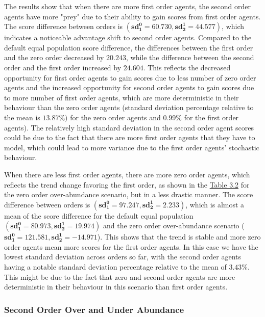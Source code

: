 The results show that when there are more first order agents, the second order agents have more "prey" due to their ability to gain scores from first order agents. The score difference between orders is $(\mathbf{sd^0_1 = 60.730}, \mathbf{sd^1_2 = 44.577})$, which indicates a noticeable advantage shift to second order agents. Compared to the default equal population score difference, the differences between the first order and the zero order decreased by $\mathbf{20.243}$, while the difference between the second order and the first order increased by $\mathbf{24.604}$. This reflects the decreased opportunity for first order agents to gain scores due to less number of zero order agents and the increased opportunity for second order agents to gain scores due to more number of first order agents, which are more deterministic in their behaviour than the zero order agents (standard deviation percentage relative to the mean is $\mathbf{13.87\%})$ for the zero order agents and $\mathbf{0.99\%}$ for the first order agents). The relatively high standard deviation in the second order agent scores could be due to the fact that there are more first order agents that they have to model, which could lead to more variance due to the first order agents' stochastic behaviour.

When there are less first order agents, there are more zero order agents, which reflects the trend change favoring the first order, as shown in the \hyperref[table:non-sig-zero-order-simple]{Table 3.2} for the zero order over-abundance scenario, but in a less drastic manner. The score difference between orders is $(\mathbf{sd^0_1 = 97.247}, \mathbf{sd^1_2 = 2.233})$, which is almost a mean of the score difference for the default equal population $(\mathbf{sd^0_1 = 80.973}, \mathbf{sd^1_2 = 19.974})$ and the zero order over-abundance scenario ($\mathbf{sd^0_1 = 121.581}, \mathbf{sd^1_2 = -14.971}$). This shows that the trend is stable and more zero order agents mean more scores for the first order agents. In this case we have the lowest standard deviation across orders so far, with the second order agents having a notable standard deviation percentage relative to the mean of $\mathbf{3.43\%}$. This might be due to the fact that zero and second order agents are more deterministic in their behaviour in this scenario than first order agents.


\subsubsection{Second Order Over and Under Abundance}

